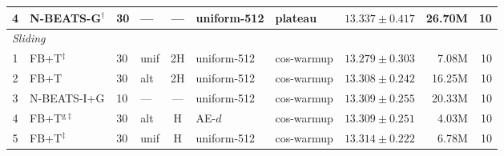 \begin{table}[h]
{\begin{tabular}{@{}clllcllrrr@{}}
    4 & N-BEATS-G$^{\dag}$    & 30 & ---  & --- & uniform-512 & plateau & $13.337 \pm 0.417$          & 26.70M & 10 \\
    \midrule
    \multicolumn{9}{l}{\textit{Sliding}} \\
    \midrule
    1 & FB+T$^{\ddag}$             & 30 & unif & 2H & uniform-512 & cos-warmup & $\mathbf{13.279 \pm 0.303}$ & 7.08M  & 10 \\
    2 & FB+T                       & 30 & alt  & 2H & uniform-512 & cos-warmup & $13.308 \pm 0.242$          & 16.25M & 10 \\
    3 & N-BEATS-I+G                & 10 & ---  & --- & uniform-512 & cos-warmup & $13.309 \pm 0.255$          & 20.33M & 10 \\
    4 & FB+T$^{\mathrm{g}\ddag}$   & 30 & alt  & H  & AE-$d$      & cos-warmup & $13.309 \pm 0.251$          & 4.03M  & 10 \\
    5 & FB+T$^{\ddag}$             & 30 & unif & H  & uniform-512 & cos-warmup & $13.314 \pm 0.222$          & 6.78M  & 10 \\
    \bottomrule
  \end{tabular}}
\end{table}